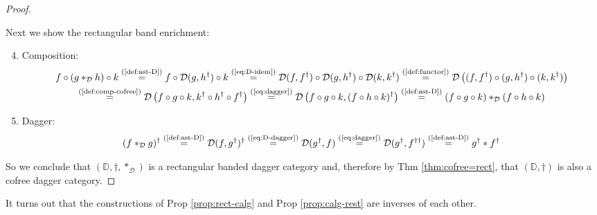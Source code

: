 \documentclass[10pt]{article}
\begin{document}
\begin{proof}
\begin{enumerate}[{\em (i)}]
\end{enumerate}
Next we show the rectangular band enrichment: 
\begin{enumerate}[{\em (i)}]
\setcounter{enumi}{3}
\item Composition:
\begin{gather*}
f \circ (g \ast_\mathcal{D} h) \circ k \overset{\text{(\ref{def:ast-D})}}{=} f \circ \mathcal{D}(g,h^\dagger) \circ k \overset{\text{(\ref{eq:D-idem})}}{=} \mathcal{D}( f, f^\dagger ) \circ \mathcal{D}( g, h^\dagger ) \circ \mathcal{D}( k, k^\dagger)   \overset{\text{(\ref{def:functor})}}{=} \mathcal{D}\left( (f,f^\dagger) \circ (g, h^\dagger) \circ ( k, k^\dagger ) \right) \\
\overset{\text{(\ref{def:comp-cofree})}}{=} \mathcal{D}\left( f \circ g \circ k, k^\dagger \circ h^\dagger \circ f^\dagger \right) \overset{\text{(\ref{eq:dagger})}}{=}   \mathcal{D}\left( f \circ g \circ k, (f \circ h \circ k)^\dagger \right) \overset{\text{(\ref{def:ast-D})}}{=} (f \circ g \circ k) \ast_\mathcal{D} (f \circ h \circ k) 
\end{gather*}
\item Dagger: 
\begin{gather*}
    (f \ast_\mathcal{D}  g)^\dagger \overset{\text{(\ref{def:ast-D})}}{=} \mathcal{D}( f, g^\dagger )^\dagger \overset{\text{(\ref{eq:D-dagger})}}{=}  \mathcal{D}( g^\dagger, f ) \overset{\text{(\ref{eq:dagger})}}{=} \mathcal{D}( g^\dagger, f^{\dagger\dagger} )  \overset{\text{(\ref{def:ast-D})}}{=} g^\dagger \ast f^\dagger 
\end{gather*}
\end{enumerate}
So we conclude that $(\mathbb{D},\dagger,\ast_\mathcal{D})$ is a rectangular banded dagger category and, therefore by Thm \ref{thm:cofree=rect}, that $(\mathbb{D},\dagger)$ is also a cofree dagger category. 
\end{proof}

It turns out that the constructions of Prop \ref{prop:rect-calg} and Prop \ref{prop:calg-rest} are inverses of each other.
\end{document}
